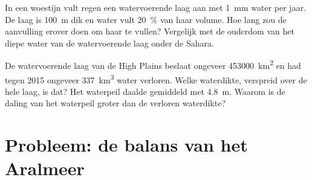 \begin{exercise}[$\star\star\star$]\label{exo:g10:freshwater-resources:14}
In een woestijn vult regen een watervoerende laag aan met \qty{1}{mm} water per
jaar. De laag is \qty{100}{m} dik en water vult \qty{20}{\percent} van haar
volume. Hoe lang zou de aanvulling erover doen om haar te vullen? Vergelijk met
de ouderdom van het diepe water van de watervoerende laag onder de Sahara.
\end{exercise}

\begin{exercise}[$\star\star\star$]\label{exo:g10:freshwater-resources:15}
De watervoerende laag van de High Plains beslaat ongeveer \qty{453000}{km^2} en
had tegen 2015 ongeveer \qty{337}{km^3} water verloren. Welke waterdikte, verspreid
over de hele laag, is dat? Het waterpeil daalde gemiddeld met \qty{4.8}{m}.
Waarom is de daling van het waterpeil groter dan de verloren waterdikte?
\end{exercise}

\section{Probleem: de balans van het Aralmeer}

